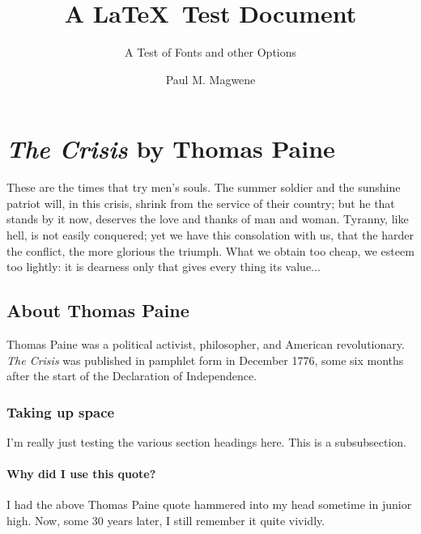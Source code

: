 
\newcommand{\normdistn}{\ensuremath{%
f(x) = 
\frac{1}{\sqrt{2\pi\sigma^2}} e^{-\frac{(x-\mu)^2}{2\sigma^2}}
}}

\newcommand{\varx}{\ensuremath{\frac{1}{n}\sum_{i=1}^{n}(x_i-\mu)}}


\title{\Large A \LaTeX\ Test Document}
\subtitle{\large A Test of Fonts and other Options}
\author{\normalsize Paul M. Magwene}
\date{}

\maketitle
    
\section{\textit{The Crisis} by Thomas Paine}

These are the times that try men's souls. The summer soldier and the sunshine
patriot will, in this crisis, shrink from the service of their country; but he
that stands by it now, deserves the love and thanks of man and woman. Tyranny,
like hell, is not easily conquered; yet we have this consolation with us, that
the harder the conflict, the more glorious the triumph. What we obtain too
cheap, we esteem too lightly: it is dearness only that gives every thing its
value...

\subsection{About Thomas Paine}
Thomas Paine was a political activist, philosopher, and American revolutionary.
\textit{The Crisis} was published in pamphlet form in December 1776, some six
months after the start of the Declaration of Independence.

\subsubsection{Taking up space}
I'm really just testing the various section headings here.  This is a
subsubsection.

\paragraph{Why did I use this quote?} 
I had the above Thomas Paine quote hammered into my head sometime in junior
high. Now, some 30 years later, I still remember it quite vividly.


